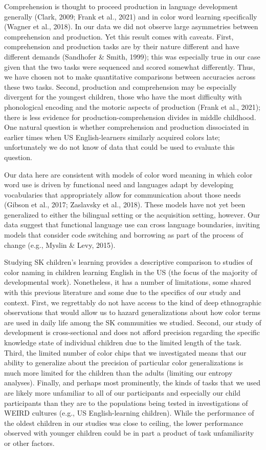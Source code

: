 \documentclass[
  ,apa7,floatsintext]{apa6}
\begin{document}
Comprehension is thought to proceed production in language development generally (Clark, 2009; Frank et al., 2021) and in color word learning specifically (Wagner et al., 2018). In our data we did not observe large asymmetries between comprehension and production. Yet this result comes with caveats. First, comprehension and production tasks are by their nature different and have different demands (Sandhofer \& Smith, 1999); this was especially true in our case given that the two tasks were sequenced and scored somewhat differently. Thus, we have chosen not to make quantitative comparisons between accuracies across these two tasks. Second, production and comprehension may be especially divergent for the youngest children, those who have the most difficulty with phonological encoding and the motoric aspects of production (Frank et al., 2021); there is less evidence for production-comprehension divides in middle childhood. One natural question is whether comprehension and production dissociated in earlier times when US English-learners similarly acquired colors late; unfortunately we do not know of data that could be used to evaluate this question.

Our data here are consistent with models of color word meaning in which color word use is driven by functional need and languages adapt by developing vocabularies that appropriately allow for communication about those needs (Gibson et al., 2017; Zaslavsky et al., 2018). These models have not yet been generalized to either the bilingual setting or the acquisition setting, however. Our data suggest that functional language use can cross language boundaries, inviting models that consider code switching and borrowing as part of the process of change (e.g., Myslin \& Levy, 2015).

Studying SK children's learning provides a descriptive comparison to studies of color naming in children learning English in the US (the focus of the majority of developmental work). Nonetheless, it has a number of limitations, some shared with this previous literature and some due to the specifics of our study and context. First, we regrettably do not have access to the kind of deep ethnographic observations that would allow us to hazard generalizations about how color terms are used in daily life among the SK communities we studied. Second, our study of development is cross-sectional and does not afford precision regarding the specific knowledge state of individual children due to the limited length of the task. Third, the limited number of color chips that we investigated means that our ability to generalize about the precision of particular color generalizations is much more limited for the children than the adults (limiting our entropy analyses). Finally, and perhaps most prominently, the kinds of tasks that we used are likely more unfamiliar to all of our participants and especially our child participants than they are to the populations being tested in investigations of WEIRD cultures (e.g., US English-learning children). While the performance of the oldest children in our studies was close to ceiling, the lower performance observed with younger children could be in part a product of task unfamiliarity or other factors.
\end{document}

